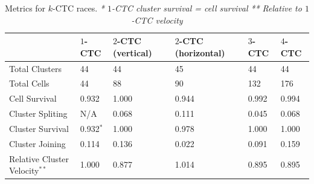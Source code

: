 \documentclass[12pt]{article}
\begin{document}
\begin{table}[h]
    \begin{tabular}{|l|l|l|l|l|l|}
    \hline
    ~                & $1$-CTC   & $2$-CTC (vertical) & $2$-CTC (horizontal) & $3$-CTC & $4$-CTC \\ \hline
    Total Clusters   & 44      & 44           & 45          & 44 & 44  \\ \hline
    Total Cells 		 & 44			 & 88					& 90						& 132 & 176 \\ \hline
    Cell Survival    & 0.932  & 1.000        & 0.944        & 0.992 & 0.994 \\ \hline
    Cluster Spliting & N/A     & 0.068       & 0.111        & 0.045 & 0.068 \\ \hline
    Cluster Survival & 0.932$^*$ & 1.000      & 0.978       & 1.000 & 1.000 \\ \hline
    Cluster Joining  & 0.114  & 0.136        & 0.022        & 0.091 & 0.159 \\ \hline
    Relative Cluster Velocity$^{**}$ & 1.000  & 0.877       & 1.014     & 0.895  & 0.895 \\ \hline
    \end{tabular}
    \caption{Metrics for $k$-CTC races.
    \emph{* $1$-CTC cluster survival = cell survival}
    \emph{** Relative to $1$-CTC velocity}}
    \label{racestats}
\end{table}
\end{document}
